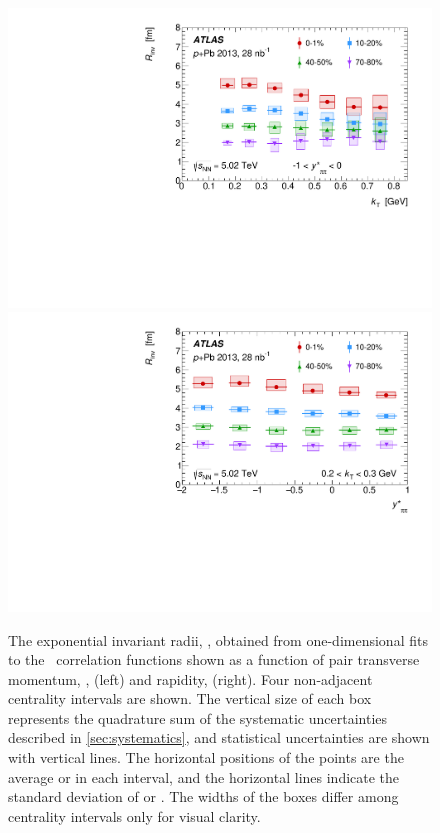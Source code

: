 \begin{figure}[t]
\centering
\includegraphics[width=0.49\linewidth]{canqinv_R_vs_kt.pdf}
\includegraphics[width=0.49\linewidth]{canqinv_R_vs_kys.pdf}
\caption{The exponential invariant radii, \Rinv, obtained from one-dimensional fits to
the \qinv\ correlation functions shown as a function of pair transverse momentum, \kt, (left) and rapidity, \kys (right). Four non-adjacent centrality intervals are shown. The vertical size of each box represents the quadrature sum of the systematic uncertainties described in \cref{sec:systematics}, and statistical uncertainties are shown with vertical lines. The horizontal positions of the points are the average \kt or \kys in each interval, and the horizontal lines indicate the standard deviation of \kt or \kys. The widths of the boxes differ among centrality intervals only for visual clarity.}
\label{fig:results_Rinv_kt}
\end{figure}
